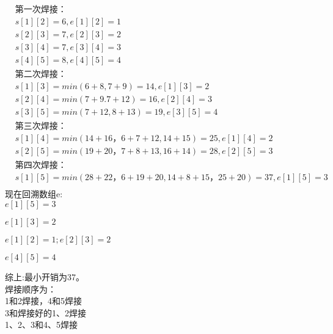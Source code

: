 \documentclass[UTF8]{ctexart}
\begin{document}
$$
\begin{aligned}
&\text {第一次焊接：} \\ 
&s[1][2]=6,e[1][2]=1\\
&s[2][3]=7,e[2][3]=2\\
&s[3][4]=7,e[3][4]=3\\
&s[4][5]=8,e[4][5]=4\\
&\text {第二次焊接：} \\
&s[1][3]=min(6+8,7+9)=14,e[1][3]=2\\
&s[2][4]=min(7+9.7+12)=16,e[2][4]=3\\
&s[3][5]=min(7+12,8+13)=19,e[3][5]=4\\
&\text {第三次焊接：} \\
&s[1][4]=min(14+16，6+7+12,14+15)=25,e[1][4]=2\\
&s[2][5]=min(19+20，7+8+13,16+14)=28,e[2][5]=3\\
&\text {第四次焊接：} \\
&s[1][5]=min(28+22，6+19+20,14+8+15，25+20)=37,e[1][5]=3\\
\end{aligned}
$$
现在回溯数组e:\\
$e[1][5] = 3$

\quad $e[1][3] = 2$

\qquad $e[1][2] = 1;e[2][3] = 2$

\quad $e[4][5] = 4$

综上:最小开销为37。  \\
焊接顺序为：\\
1和2焊接，4和5焊接\\
3和焊接好的1、2焊接\\
1、2、3和4、5焊接\\
\end{document}
